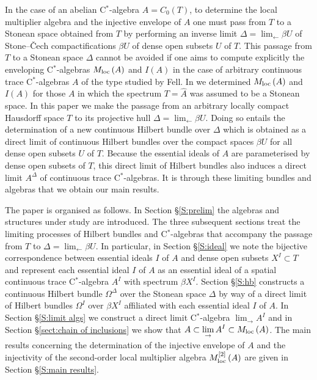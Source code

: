 \documentclass{amsart}
\theoremstyle{definition}
\theoremstyle{remark}
\begin{document}
In the case of an abelian C$^*$-algebra $A=C_0(T)$, to determine the local multiplier algebra and the injective envelope of $A$
one must pass from $T$ to a Stonean space
obtained from $T$ by performing an inverse limit  $\Delta=\displaystyle\lim_{\leftarrow}\beta U$
of Stone--\v Cech compactifications $\beta U$ of dense open subsets $U$ of $T$.
This passage from $T$ to a Stonean space $\Delta$ cannot be avoided if one aims to compute explicitly the enveloping C$^*$-algebras
${M_{\rm loc}\,}(A)$ and $I(A)$
in the case of arbitrary continuous trace C$^*$-algebras $A$ of the type studied by Fell.
In \cite{argerami--farenick--massey2010} we determined ${M_{\rm loc}\,}(A)$ and $I(A)$ for those $A$
in which the spectrum $T=\hat A$ was assumed to be a Stonean space. In this paper we make the passage from an
arbitrary locally compact Hausdorff space $T$ to its projective hull
$\Delta=\displaystyle\lim_{\leftarrow}\beta U$. Doing so entails the determination of a new continuous Hilbert bundle over $\Delta$ which is obtained as
a direct limit of continuous Hilbert bundles over the compact spaces $\beta U$ for all dense open subsets $U$ of $T$.
Because the essential ideals of $A$ are parameterised by dense open subsets of $T$, this direct limit of
Hilbert bundles also induces a direct limit $A^\Delta$ of continuous trace C$^*$-algebras. 
It is through these limiting bundles and algebras that we obtain our main results.

The paper is organised as follows. In Section \S\ref{S:prelim} the algebras and
structures under study are introduced. The three subsequent sections treat the limiting
processes of Hilbert bundles and C$^*$-algebras that accompany the passage from
$T$ to $\Delta=\displaystyle\lim_{\leftarrow}\beta U$. In particular, in Section \S\ref{S:ideal}
we note the bijective correspondence between essential ideals $I$ of $A$ and dense
open subsets $X^I\subset T$ and represent each
essential ideal $I$ of $A$ as an essential ideal of a spatial continuous trace C$^*$-algebra
$A^I$ with spectrum $\beta X^I$. Section \S\ref{S:hb} constructs a continuous Hilbert bundle $\Omega^\Delta$
over the Stonean space $\Delta$ by way of a direct limit of Hilbert bundles $\Omega^I$ over
$\beta X^I$ affiliated with each essential ideal $I$ of $A$. In Section \S\ref{S:limit algs} we construct a direct
limit C$^*$-algebra $\displaystyle\lim_\rightarrow A^I$ and in Section \S\ref{sect:chain of inclusions} we show that
$A\subset\displaystyle\lim_\rightarrow A^I\subset {M_{\rm loc}\,}(A)$. The main results concerning the
determination of the injective envelope of $A$ and the injectivity of the second-order local multiplier
algebra ${M_{\rm loc}^{[2]}\,}(A)$ are given in Section \S\ref{S:main results}.
\end{document}
